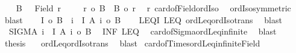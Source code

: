 \begin{isabellebody}
\isatagproof
{}\isamarkupfalse%
{\isacharminus}{\kern0pt}\isanewline
\ \ \isamarkupfalse%
\ {\isacharquery}{\kern0pt}B\ \ {\isacharequal}{\kern0pt}\ {\isachardoublequoteopen}Field\ r{\isachardoublequoteclose}\isanewline
\ \ \isamarkupfalse%
\ {}{\isacharcolon}{\kern0pt}\ {\isachardoublequoteopen}r\ {\isacharequal}{\kern0pt}o\ {\isacharbar}{\kern0pt}{\isacharquery}{\kern0pt}B{\isacharbar}{\kern0pt}\ {\isasymand}\ {\isacharbar}{\kern0pt}{\isacharquery}{\kern0pt}B{\isacharbar}{\kern0pt}\ {\isacharequal}{\kern0pt}o\ r{\isachardoublequoteclose}\ \isamarkupfalse%
\ r\ card{\isacharunderscore}{\kern0pt}of{\isacharunderscore}{\kern0pt}Field{\isacharunderscore}{\kern0pt}ordIso\isanewline
\ \ ordIso{\isacharunderscore}{\kern0pt}symmetric\ \isamarkupfalse%
\ blast\isanewline
\ \ \isamarkupfalse%
\ {\isachardoublequoteopen}{\isacharbar}{\kern0pt}I{\isacharbar}{\kern0pt}\ {\isasymle}o\ {\isacharbar}{\kern0pt}{\isacharquery}{\kern0pt}B{\isacharbar}{\kern0pt}{\isachardoublequoteclose}\ \ {\isachardoublequoteopen}{\isasymforall}i\ {\isasymin}\ I{\isachardot}{\kern0pt}\ {\isacharbar}{\kern0pt}A\ i{\isacharbar}{\kern0pt}\ {\isasymle}o\ {\isacharbar}{\kern0pt}{\isacharquery}{\kern0pt}B{\isacharbar}{\kern0pt}{\isachardoublequoteclose}\isanewline
\ \ \isamarkupfalse%
\ LEQ{\isacharunderscore}{\kern0pt}I\ LEQ\ ordLeq{\isacharunderscore}{\kern0pt}ordIso{\isacharunderscore}{\kern0pt}trans\ \isamarkupfalse%
\ blast{\isacharplus}{\kern0pt}\isanewline
\ \ \isamarkupfalse%
\ \ {\isachardoublequoteopen}{\isacharbar}{\kern0pt}SIGMA\ i\ {\isacharcolon}{\kern0pt}\ I{\isachardot}{\kern0pt}\ A\ i{\isacharbar}{\kern0pt}\ {\isasymle}o\ {\isacharbar}{\kern0pt}{\isacharquery}{\kern0pt}B{\isacharbar}{\kern0pt}{\isachardoublequoteclose}\ \isamarkupfalse%
\ INF\ LEQ\isanewline
\ \ card{\isacharunderscore}{\kern0pt}of{\isacharunderscore}{\kern0pt}Sigma{\isacharunderscore}{\kern0pt}ordLeq{\isacharunderscore}{\kern0pt}infinite\ \isamarkupfalse%
\ blast\isanewline
\ \ \isamarkupfalse%
\ {\isacharquery}{\kern0pt}thesis\ \isamarkupfalse%
\ {}\ ordLeq{\isacharunderscore}{\kern0pt}ordIso{\isacharunderscore}{\kern0pt}trans\ \isamarkupfalse%
\ blast\isanewline
{}\isamarkupfalse%
%
\endisatagproof
{\isafoldproof}%
%
\isadelimproof
\isanewline
%
\endisadelimproof
\isanewline
{}\isamarkupfalse%
\ card{\isacharunderscore}{\kern0pt}of{\isacharunderscore}{\kern0pt}Times{\isacharunderscore}{\kern0pt}ordLeq{\isacharunderscore}{\kern0pt}infinite{\isacharunderscore}{\kern0pt}Field{\isacharcolon}{\kern0pt}\isanewline

\end{isabellebody}
